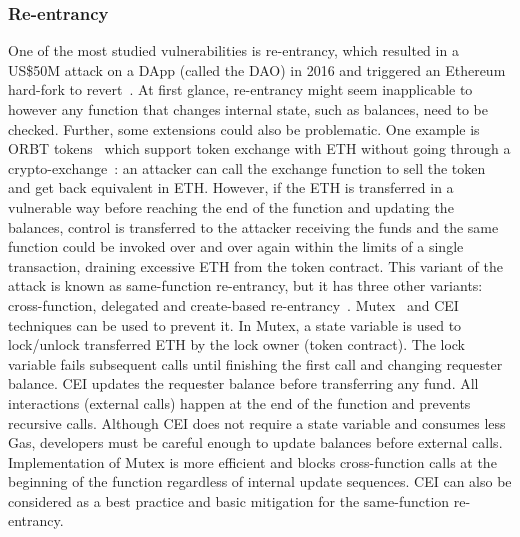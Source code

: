 \subsubsection{Re-entrancy}
One of the most studied vulnerabilities is re-entrancy, which resulted in a US\$50M attack on a DApp (called the DAO) in 2016 and triggered an Ethereum hard-fork to revert~\cite{DAO1}. At first glance, re-entrancy might seem inapplicable to \erc however any function that changes internal state, such as balances, need to be checked. Further, some \erc extensions could also be problematic. {\blue One example is ORBT tokens~\cite{ORBTToken} which support token exchange with ETH without going through a crypto-exchange~\cite{ORBT}}: an attacker can call the exchange function to sell the token and get back equivalent in ETH. However, if the ETH is transferred in a vulnerable way before reaching the end of the function and updating the balances, control is transferred to the attacker receiving the funds and the same function could be invoked over and over again within the limits of a single transaction, draining excessive ETH from the token contract. This variant of the attack is known as same-function re-entrancy, but it has three other variants: cross-function, delegated and create-based re-entrancy~\cite{SEREUM}. Mutex~\cite{WiKiMutex} and CEI~\cite{SolidtyDocSec} techniques can be used to prevent it. In Mutex, a state variable is used to lock/unlock transferred ETH by the lock owner (\ie token contract). The lock variable fails subsequent calls until finishing the first call and changing requester balance. CEI updates the requester balance before transferring any fund. All interactions (\ie external calls) happen at the end of the function and prevents recursive calls. Although CEI does not require a state variable and consumes less Gas, developers must be careful enough to update balances before external calls. { \blue Implementation of Mutex is more efficient and blocks cross-function calls at the beginning of the function regardless of internal update sequences. CEI can also be considered as a best practice and basic mitigation for the same-function re-entrancy.}

